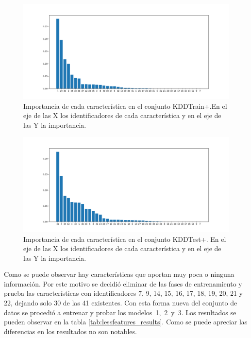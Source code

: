 \begin{figure}[h!t]
    \includegraphics[width=\linewidth]{Images/features_relevance_train.png}
    \caption{Importancia de cada característica en el conjunto KDDTrain+.En el eje de las X los identificadores de cada característica y en el eje de las Y la importancia.}
    \label{fig:features_relevance_train}
\end{figure}

\begin{figure}[t]
    \includegraphics[width=\linewidth]{Images/features_relevance_test.png}
    \caption{Importancia de cada característica en el conjunto KDDTest+. En el eje de las X los identificadores de cada característica y en el eje de las Y la importancia.}
    \label{fig:features_relevance_test}
\end{figure}

Como se puede observar hay características que aportan muy poca o ninguna información. Por este motivo se decidió eliminar de las fases de entrenamiento y prueba las características con identificadores 7, 9, 14, 15, 16, 17, 18, 19, 20, 21 y 22, dejando solo 30 de las 41 existentes. Con esta forma nueva del conjunto de datos se procedió a entrenar y probar los modelos~1,~2~y~3. Los resultados se pueden observar en la tabla \ref{tab:lessfeatures_results}. Como se puede apreciar las diferencias en los resultados no son notables.

